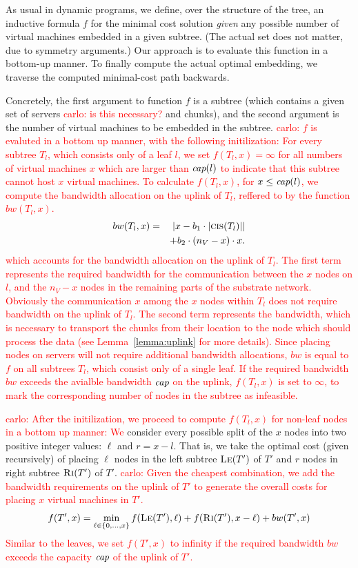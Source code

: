 \documentclass[9pt]{sigcomm-alternate}
\newcommand{\carlo}[1]{\textcolor{red}{carlo: #1}}
\newcommand{\ChunkCount}{\ensuremath{\textsc{cis}}}
\newcommand{\capacity}{\emph{cap}}
\newcommand{\CostTrans}{\ensuremath{b_1}}
\newcommand{\CostCom}{\ensuremath{b_2}}
\newcommand{\Vms}{\ensuremath{n_V}}
\begin{document}
As usual in dynamic programs, we define, over the structure of the tree, an inductive formula $f$ for
the minimal cost solution \emph{given} any possible number of virtual
machines embedded in a given subtree. (The actual set does not matter,
due to symmetry arguments.) 
Our approach is to evaluate this function in a bottom-up
manner.  
To finally compute the actual optimal embedding, 
we traverse the computed minimal-cost path backwards.

Concretely, the first argument to function $f$ 
is a subtree (which contains a given set of servers \carlo{is this necessary?} 
and chunks), 
and the
second argument is the number of virtual machines to be embedded in the subtree.
\carlo{$f$ is evaluted in a bottom up manner, with the following initilization: 
For every subtree $T_l$, which consists only of a leaf $l$, we set $f(T_l,x) = 
\infty$ for all numbers of virtual machines $x$ which are larger than 
$\capacity(l)$ to indicate that this subtree cannot host $x$ virtual machines.
To calculate $f(T_l, x)$, for $x \leq \capacity(l)$, we compute the  
bandwidth allocation on the uplink of $T_l$, reffered to by the function 
$bw(T_l,x)$. \begin{eqnarray*}
 bw(T_l,x)&=& |x - \CostTrans \cdot |\ChunkCount(T_l)|| \\ && + 
\CostCom \cdot (\Vms - x) \cdot x.
\end{eqnarray*}
which accounts for the bandwidth allocation on the uplink of $T_l$. The first 
term represents the required bandwidth for the communication between the $x$ 
nodes on $l$, and the $\Vms - x$ nodes in the remaining parts of the substrate 
network. Obviously the communication $x$ among the $x$ nodes within $T_l$ 
does not require bandwidth on the uplink of $T_l$. The second term represents 
the bandwidth, which is necessary to transport the chunks from their location to 
the node which should process the data (see Lemma~\ref{lemma:uplink} for more 
details). Since placing nodes on servers will not require additional bandwidth 
allocations, $bw$ is equal to $f$ on all subtrees $T_l$, which consist only of 
a single leaf. If the required bandwidth $bw$ exceeds the avialble bandwidth 
$\capacity$ on the uplink, $f(T_l,x)$ is set to $\infty$, to mark the 
corresponding number of nodes in the subtree as infeasible.}

\carlo{After the initilization, we proceed to compute $f(T_l,x)$ for non-leaf 
nodes in a bottom up manner: We }consider every possible split of the $x$ nodes 
into two positive integer
values: $\ell$ and $r = x - l$. That is, we take the optimal cost 
(given recursively) of placing $\ell$ nodes in
the left subtree $\textsc{Le}(T')$ of $T'$ and $r$ nodes in right subtree $\textsc{Ri}(T')$ of
$T'$. \carlo{Given the cheapest combination, we add the bandwidth requirements 
on the uplink of $T'$ to generate the overall costs for placing $x$ virtual 
machines in $T'$.
$$f(T',x) =   \min_{\ell \in \{0, \ldots, x\}}  f(\textsc{Le}(T'), {\ell}) + 
f(\textsc{Ri}(T'), x - {\ell}) + bw(T',x)$$
Similar to the leaves, we set $f(T',x)$ to infinity if the required bandwidth 
$bw$ exceeds the capacity $\capacity$ of the uplink of $T'$.}
\end{document}
